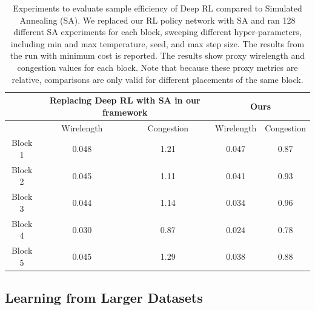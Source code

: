 \documentclass{article}
\begin{document}
\begin{table}[ht]
\centering
\caption{Experiments to evaluate sample efficiency of Deep RL compared to Simulated Annealing (SA). We replaced our RL policy network with SA and ran 128 different SA experiments for each block, sweeping different hyper-parameters, including min and max temperature, seed, and max step size. The results from the run with minimum cost is reported. The results show proxy wirelength and congestion values for each block. Note that because these proxy metrics are relative, comparisons are only valid for different placements of the same block.}
\begin{tabular}{|c|c|c|c|c|}
\hline
        & \multicolumn{2}{c|}{Replacing Deep RL with SA in our framework} & \multicolumn{2}{c|}{Ours} \\ \hline
        & Wirelength              & Congestion              & Wirelength  & Congestion  \\ \hline

Block 1 & 0.048 & 1.21 & 0.047 & 0.87 \\ \hline
Block 2 & 0.045 & 1.11 & 0.041 & 0.93 \\ \hline
Block 3 & 0.044 & 1.14 & 0.034 & 0.96 \\ \hline
Block 4 & 0.030 & 0.87 & 0.024 & 0.78 \\ \hline
Block 5 & 0.045 & 1.29 & 0.038 & 0.88 \\ \hline
\end{tabular}
\label{table:rl-vs-sa}
\end{table}
\subsection{Learning from Larger Datasets} 
\end{document}

